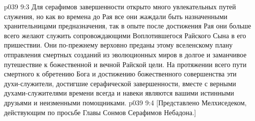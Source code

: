 \vs p039 9:3 Для серафимов завершенности открыто много увлекательных путей служения, но как во времена до Рая все они жаждали быть назначенными хранительницами предназначения, так в опыте после достижения Рая они больше всего желают служить сопровождающими Воплотившегося Райского Сына в его пришествии. Они по\hyp{}прежнему верховно преданы этому вселенскому плану отправления смертных созданий из эволюционных миров в долгое и заманчивое путешествие к божественной и вечной Райской цели. На протяжении всего пути смертного к обретению Бога и достижению божественного совершенства эти духи\hyp{}служители, достигшие серафической завершенности, вместе с верными духами\hyp{}служителями времени всегда и навеки являются вашими истинными друзьями и неизменными помощниками.
\vsetoff
\vs p039 9:4 [Представлено Мелхиседеком, действующим по просьбе Главы Сонмов Серафимов Небадона.]
